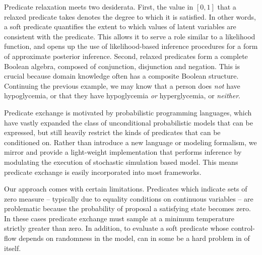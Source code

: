Predicate relaxation meets two desiderata.
First, the value in $[0, 1]$ that a relaxed predicate takes denotes the degree to which it is satisfied.
In other words, a soft predicate quantifies the extent to which values of latent variables are consistent with the predicate.
This allows it to serve a role similar to a likelihood function, and opens up the use of likelihood-based inference procedures for a form of approximate posterior inference.
Second, relaxed predicates form a complete Boolean algebra, composed of conjunction, disjunction and negation.
This is crucial because domain knowledge often has a composite Boolean structure.
Continuing the previous example, we may know that a person does \emph{not} have hypoglycemia, or that they have hypoglycemia \emph{or} hyperglycemia, or \emph{neither}.


Predicate exchange is motivated by probabilistic programming languages, which have vastly expanded the class of unconditional probabilistic models that can be expressed, but still heavily restrict the kinds of predicates that can be conditioned on.
Rather than introduce a new language or modeling formalism, we mirror   \cite{wingate2011lightweight} and provide a light-weight implementation that performs inference by modulating the execution of stochastic simulation based model.
This means predicate exchange is easily incorporated into most frameworks. 

Our approach comes with certain limitations.
Predicates which indicate sets of zero measure -- typically due to equality conditions on continuous variables -- are problematic because the probability of proposal a satisfying state becomes zero.
In these cases predicate exchange must sample at a minimum temperature strictly greater than zero.
In addition, to evaluate a soft predicate whose control-flow depends on randomness in the model, can in some be a hard problem in of itself.

